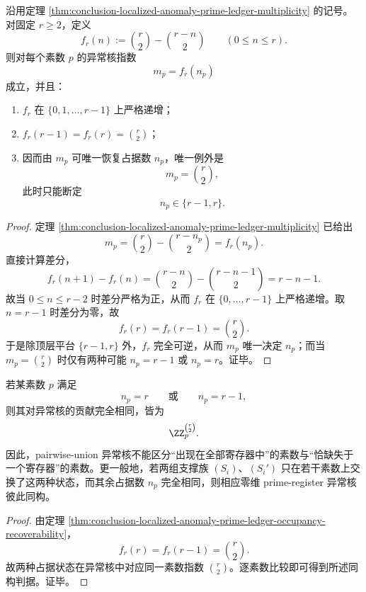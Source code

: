 \begin{theorem}\label{thm:conclusion-localized-anomaly-prime-ledger-occupancy-recoverability}
沿用定理 \ref{thm:conclusion-localized-anomaly-prime-ledger-multiplicity} 的记号。对固定 \(r\ge 2\)，定义
\[
f_r(n):=\binom r2-\binom{r-n}{2}
\qquad (0\le n\le r).
\]
则对每个素数 \(p\) 的异常核指数
\[
m_p=f_r(n_p)
\]
成立，并且：
\begin{enumerate}
\normalfont
  \item \(f_r\) 在 \(\{0,1,\dots,r-1\}\) 上严格递增；
  \item \(f_r(r-1)=f_r(r)=\binom r2\)；
  \item 因而由 \(m_p\) 可唯一恢复占据数 \(n_p\)，唯一例外是
  \[
  m_p=\binom r2,
  \]
  此时只能断定
  \[
  n_p\in\{r-1,r\}.
  \]
\end{enumerate}
\end{theorem}
\begin{proof}
定理 \ref{thm:conclusion-localized-anomaly-prime-ledger-multiplicity} 已给出
\[
m_p=\binom r2-\binom{r-n_p}{2}=f_r(n_p).
\]
直接计算差分，
\[
f_r(n+1)-f_r(n)
=
\binom{r-n}{2}-\binom{r-n-1}{2}
=
r-n-1.
\]
故当 \(0\le n\le r-2\) 时差分严格为正，从而 \(f_r\) 在 \(\{0,\dots,r-1\}\) 上严格递增。取 \(n=r-1\) 时差分为零，故
\[
f_r(r)=f_r(r-1)=\binom r2.
\]
于是除顶层平台 \(\{r-1,r\}\) 外，\(f_r\) 完全可逆，从而 \(m_p\) 唯一决定 \(n_p\)；而当 \(m_p=\binom r2\) 时仅有两种可能 \(n_p=r-1\) 或 \(n_p=r\)。证毕。
\end{proof}

\begin{corollary}[全覆盖素数与余一缺失素数的异常不可区分性]\label{cor:conclusion-localized-anomaly-prime-ledger-full-vs-almost-full-indistinguishable}
若某素数 \(p\) 满足
\[
n_p=r
\qquad\text{或}\qquad
n_p=r-1,
\]
则其对异常核的贡献完全相同，皆为
\[
\ZZ_p^{\binom r2}.
\]
因此，pairwise-union 异常核不能区分“出现在全部寄存器中”的素数与“恰缺失于一个寄存器”的素数。更一般地，若两组支撑族 \((S_i)\)、\((S_i')\) 只在若干素数上交换了这两种状态，而其余占据数 \(n_p\) 完全相同，则相应零维 prime-register 异常核彼此同构。
\end{corollary}
\begin{proof}
由定理 \ref{thm:conclusion-localized-anomaly-prime-ledger-occupancy-recoverability}，
\[
f_r(r)=f_r(r-1)=\binom r2.
\]
故两种占据状态在异常核中对应同一素数指数 \(\binom r2\)。逐素数比较即可得到所述同构判据。证毕。
\end{proof}


